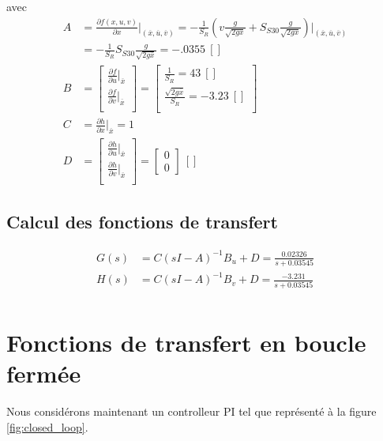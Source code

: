 \documentclass[frenchb, paper=a4, fontsize=11pt]{scrartcl}
\newcommand*\eq[1]{\overline{#1}} 				%
\numberwithin{equation}{section}					%
\numberwithin{figure}{section}					%
\numberwithin{table}{section}						%
\begin{document}
avec 
\begin{align}
A& = \frac{\partial f(x,u,v)}{\partial x}\rvert_{(\eq{x},\eq{u},\eq{v})} = -\frac{1}{S_R}(v\frac{g}{\sqrt{2gx}} + S_{S30}\frac{g}{\sqrt{2gx}})\rvert_{(\eq{x},\eq{u},\eq{v})} \\
&= -\frac{1}{S_R	} S_{S30} \frac{g}{\sqrt{2g\eq{x}}} = \SI{-.0355}{[]}\\
B &=\left[ \begin{array}{l}
 \frac{\partial f}{\partial u}\rvert_{\eq{x}} \\
  \frac{\partial f}{\partial v} \rvert_{\eq{x}}\\
\end{array} \right] 
= \left[ \begin{array}{l}
 \frac{1}{S_R} = \SI{43}{[]}\\
  \frac{\sqrt{2g\eq{x}}}{S_R}= \SI{-3.23}{[]}\\
\end{array} \right] \\
C &= \frac{\partial h}{\partial x}\rvert_{\eq{x}} = \SI{1}{}\\
D&=\left[ \begin{array}{l}
 \frac{\partial h}{\partial u}\rvert_{\eq{x}} \\
  \frac{\partial h}{\partial v} \rvert_{\eq{x}}\\
\end{array} \right]  = \left[ \begin{array}{l}
0\\
0
\end{array} \right] \SI{}{[]}
\end{align}

\subsection{Calcul des fonctions de transfert}
\begin{align}
G(s) &= C(sI-A)^{-1}B_u + D = \frac{0.02326}{s+0.03545}\\
H(s) &= C(sI-A)^{-1}B_v + D = \frac{-3.231}{s+0.03545}\\
\end{align}

\section{Fonctions de transfert en boucle fermée}

Nous considérons maintenant un controlleur PI tel que représenté à la figure \ref{fig:closed_loop}.
\end{document}
